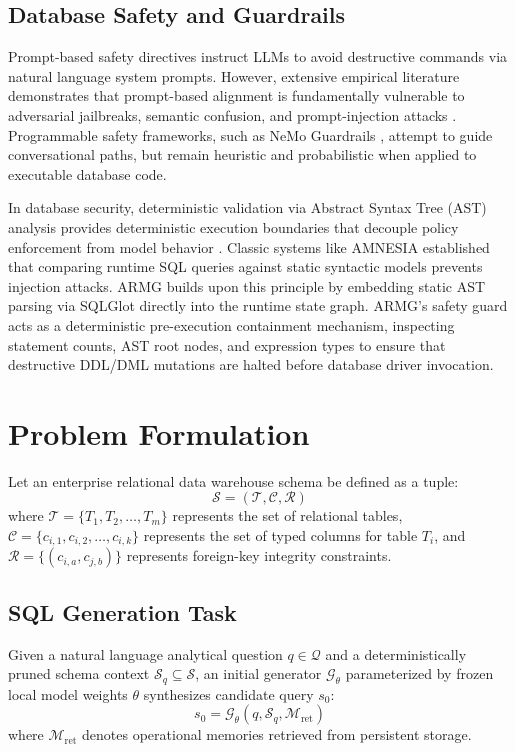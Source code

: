 \documentclass[conference]{IEEEtran}
\begin{document}
\subsection{Database Safety and Guardrails}
Prompt-based safety directives instruct LLMs to avoid destructive commands via natural language system prompts. However, extensive empirical literature demonstrates that prompt-based alignment is fundamentally vulnerable to adversarial jailbreaks, semantic confusion, and prompt-injection attacks \cite{wei2023jailbroken, zou2023universal}. Programmable safety frameworks, such as NeMo Guardrails \cite{rebedea2023nemoguardrails}, attempt to guide conversational paths, but remain heuristic and probabilistic when applied to executable database code.

In database security, deterministic validation via Abstract Syntax Tree (AST) analysis provides deterministic execution boundaries that decouple policy enforcement from model behavior \cite{mao2023sqlglot, halfond2005amnesia}. Classic systems like AMNESIA \cite{halfond2005amnesia} established that comparing runtime SQL queries against static syntactic models prevents injection attacks. ARMG builds upon this principle by embedding static AST parsing via SQLGlot \cite{mao2023sqlglot} directly into the runtime state graph. ARMG's safety guard acts as a deterministic pre-execution containment mechanism, inspecting statement counts, AST root nodes, and expression types to ensure that destructive DDL/DML mutations are halted before database driver invocation.

\section{Problem Formulation}

Let an enterprise relational data warehouse schema be defined as a tuple:
\begin{equation}
\mathcal{S} = (\mathcal{T}, \mathcal{C}, \mathcal{R})
\end{equation}
where $\mathcal{T} = \{T_1, T_2, \dots, T_m\}$ represents the set of relational tables, $\mathcal{C} = \{c_{i,1}, c_{i,2}, \dots, c_{i,k}\}$ represents the set of typed columns for table $T_i$, and $\mathcal{R} = \{(c_{i,a}, c_{j,b})\}$ represents foreign-key integrity constraints.

\subsection{SQL Generation Task}
Given a natural language analytical question $q \in \mathcal{Q}$ and a deterministically pruned schema context $\mathcal{S}_q \subseteq \mathcal{S}$, an initial generator $\mathcal{G}_{\theta}$ parameterized by frozen local model weights $\theta$ synthesizes candidate query $s_0$:
\begin{equation}
s_0 = \mathcal{G}_{\theta}(q, \mathcal{S}_q, \mathcal{M}_{\text{ret}})
\end{equation}
where $\mathcal{M}_{\text{ret}}$ denotes operational memories retrieved from persistent storage.
\end{document}
